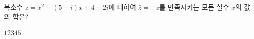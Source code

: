 복소수 $z=x^2-(5-i)x+4-2i$에 대하여 $\bar{z}=-z$를 만족시키는 모든 실수 $x$의 값의 합은? 
\begin{choices32}{$1$}{$2$}{$3$}{$4$}{$5$}\end{choices32}
